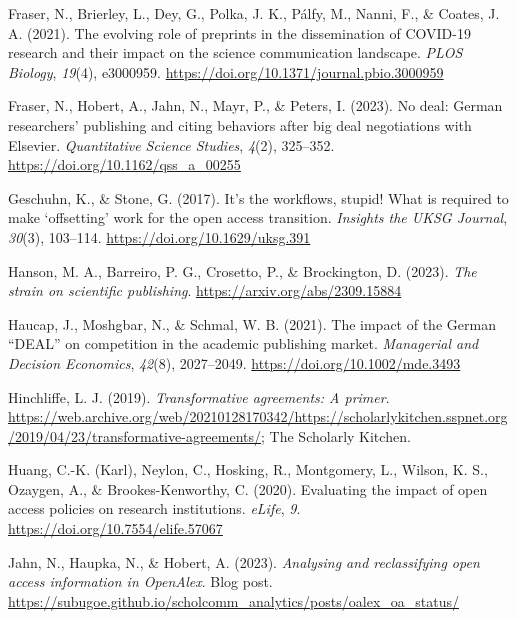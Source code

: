 \documentclass[a4paper,man,floatsintext,longtable,noextraspace,12pt]{apa6}
\newenvironment{CSLReferences}%
  {}%
  {\par}
\begin{document}
\begin{CSLReferences}{1}{0}
\leavevmode{}%
Fraser, N., Brierley, L., Dey, G., Polka, J. K., Pálfy, M., Nanni, F.,
\& Coates, J. A. (2021). The evolving role of preprints in the
dissemination of COVID-19 research and their impact on the science
communication landscape. \emph{PLOS Biology}, \emph{19}(4), e3000959.
\url{https://doi.org/10.1371/journal.pbio.3000959}

\leavevmode{}%
Fraser, N., Hobert, A., Jahn, N., Mayr, P., \& Peters, I. (2023). No
deal: German researchers' publishing and citing behaviors after big deal
negotiations with {Elsevier}. \emph{Quantitative Science Studies},
\emph{4}(2), 325--352. \url{https://doi.org/10.1162/qss_a_00255}

\leavevmode{}%
Geschuhn, K., \& Stone, G. (2017). It's the workflows, stupid! What is
required to make {`offsetting'} work for the open access transition.
\emph{Insights the {UKSG} Journal}, \emph{30}(3), 103--114.
\url{https://doi.org/10.1629/uksg.391}

\leavevmode{}%
Hanson, M. A., Barreiro, P. G., Crosetto, P., \& Brockington, D. (2023).
\emph{The strain on scientific publishing}.
\url{https://arxiv.org/abs/2309.15884}

\leavevmode{}%
Haucap, J., Moshgbar, N., \& Schmal, W. B. (2021). The impact of the
{German {``DEAL''}} on competition in the academic publishing market.
\emph{Managerial and Decision Economics}, \emph{42}(8), 2027--2049.
\url{https://doi.org/10.1002/mde.3493}

\leavevmode{}%
Hinchliffe, L. J. (2019). \emph{Transformative agreements: A primer}.
\url{https://web.archive.org/web/20210128170342/https://scholarlykitchen.sspnet.org/2019/04/23/transformative-agreements/};
The Scholarly Kitchen.

\leavevmode{}%
Huang, C.-K. (Karl), Neylon, C., Hosking, R., Montgomery, L., Wilson, K.
S., Ozaygen, A., \& Brookes-Kenworthy, C. (2020). Evaluating the impact
of open access policies on research institutions. \emph{{eLife}},
\emph{9}. \url{https://doi.org/10.7554/elife.57067}

\leavevmode{}%
Jahn, N., Haupka, N., \& Hobert, A. (2023). \emph{Analysing and
reclassifying open access information in OpenAlex}. Blog post.
\url{https://subugoe.github.io/scholcomm_analytics/posts/oalex_oa_status/}


\end{CSLReferences}
\end{document}
